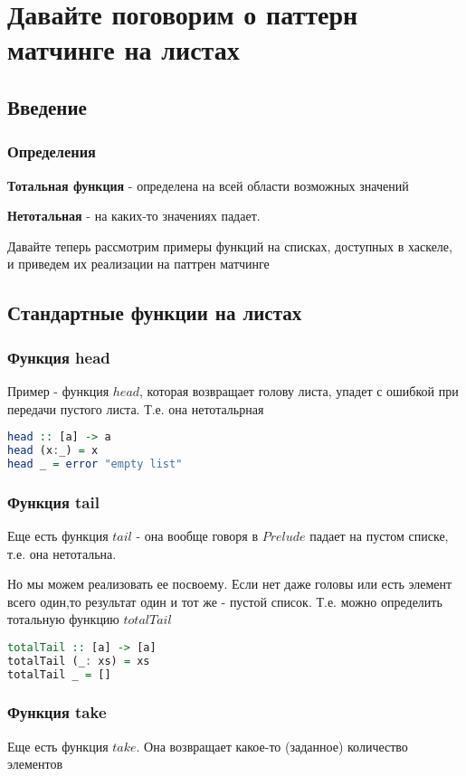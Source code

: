 \documentclass[10pt, a4paper]{article}
\begin{document}
\section{Давайте поговорим о паттерн матчинге на листах}
\subsection{Введение}

\subsubsection{Определения}
{\bf Тотальная функция} - определена на всей области возможных значений

{\bf Нетотальная} - на каких-то значениях падает.

Давайте теперь рассмотрим примеры функций на списках, доступных в хаскеле, и приведем их реализации на паттрен матчинге


\subsection{Стандартные функции на листах}


\subsubsection{Функция head}
Пример - функция $head$, которая возвращает голову листа, упадет с ошибкой при передачи пустого листа. Т.е. она нетотальрная
\begin{lstlisting}[language=haskell]
head :: [a] -> a
head (x:_) = x
head _ = error "empty list"
\end{lstlisting}

\subsubsection{Функция tail}
Еще есть функция $tail$ - она вообще говоря в $Prelude$ падает на пустом списке, т.е. она нетотальна. 

Но мы можем реализовать ее посвоему. Если нет даже головы или есть элемент всего один,то результат один и тот же - пустой список. Т.е. можно определить тотальную функцию $totalTail$ 

\begin{lstlisting}[language=haskell]
totalTail :: [a] -> [a]
totalTail (_: xs) = xs
totalTail _ = []
\end{lstlisting}

\subsubsection{Функция take}
Еще есть функция $take$. Она возвращает какое-то (заданное) количество элементов
\end{document}
